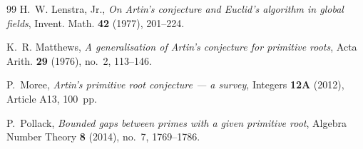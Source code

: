 \documentclass[11pt,reqno]{amsart}
\theoremstyle{plain}
\theoremstyle{definition}
\begin{document}
\begin{thebibliography}{99}
H.~W. Lenstra, Jr.,
\emph{On Artin's conjecture and Euclid's algorithm in global fields},
Invent. Math. \textbf{42} (1977), 201--224.

K.~R. Matthews,
\emph{A generalisation of Artin's conjecture for primitive roots},
Acta Arith. \textbf{29} (1976), no.~2, 113--146.

P.~Moree,
\emph{Artin's primitive root conjecture --- a survey},
Integers \textbf{12A} (2012), Article A13, 100~pp.

P.~Pollack,
\emph{Bounded gaps between primes with a given primitive root},
Algebra Number Theory \textbf{8} (2014), no.~7, 1769--1786.

\end{thebibliography}
\end{document}

